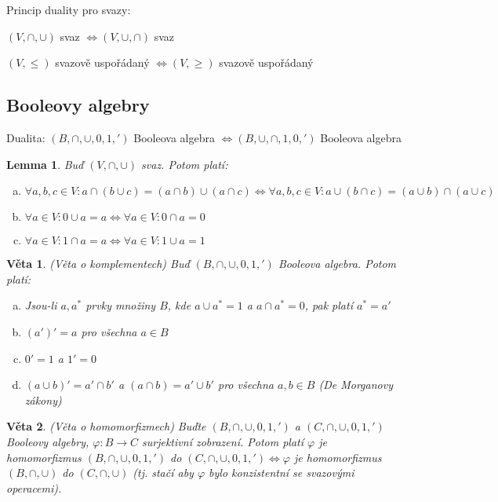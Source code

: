 \documentclass[a4paper, 11pt]{report}
\newtheorem{veta}{Věta}
\newtheorem{lemma}{Lemma}
\begin{document}
Princip duality pro svazy:

$(V, \cap, \cup)$ svaz $\Leftrightarrow (V, \cup, \cap)$ svaz

$(V, \leq)$ svazově uspořádaný $\Leftrightarrow (V, \geq)$ svazově uspořádaný

\subsection{Booleovy algebry}

Dualita: $(B, \cap, \cup, 0, 1, ')$ Booleova algebra $\Leftrightarrow (B, \cup, \cap, 1, 0, ')$ Booleova algebra

\begin{lemma}
Buď $(V, \cap, \cup)$ svaz. Potom platí:
\begin{enumerate}[a)]
	\item $\forall a,b,c \in V: a \cap (b \cup c) = (a \cap b) \cup (a \cap c) \Leftrightarrow \forall a, b, c \in V: a \cup (b \cap c) = (a \cup b) \cap (a \cup c)$
	\item $\forall a \in V: 0 \cup a = a \Leftrightarrow \forall a \in V: 0 \cap a = 0$
	\item $\forall a \in V: 1 \cap a = a \Leftrightarrow \forall a \in V: 1 \cup a = 1$
\end{enumerate}
\end{lemma}

\begin{veta}
(Věta o komplementech) Buď $(B, \cap, \cup, 0, 1, ')$ Booleova algebra. Potom platí:
\begin{enumerate}[a)]
	\item Jsou-li $a, a^*$ prvky množiny $B$, kde $a \cup a^* = 1$ a $a \cap a^* = 0$, pak platí $a^* = a'$
	\item $(a')' = a$ pro všechna $a \in B$
	\item $0' = 1$ a $1' = 0$
	\item $(a \cup b)' = a' \cap b'$ a $(a \cap b) = a' \cup b'$ pro všechna $a, b \in B$ (De Morganovy zákony)
\end{enumerate}
\end{veta}

\begin{veta}
(Věta o homomorfizmech) Buďte $(B, \cap, \cup, 0, 1, ')$ a $(C, \cap, \cup, 0, 1, ')$ Booleovy algebry, $\varphi: B \to C$ surjektivní zobrazení. Potom platí $\varphi$ je homomorfizmus $(B, \cap, \cup, 0, 1, ')$ do $(C, \cap, \cup, 0, 1, ') \Leftrightarrow \varphi$ je homomorfizmus $(B, \cap, \cup)$ do $(C, \cap, \cup)$ (tj. stačí aby $\varphi$ bylo konzistentní se svazovými operacemi).
\end{veta}
\end{document}
